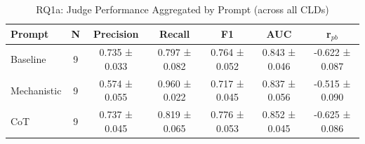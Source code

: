 \begin{table}[htbp]
\centering
\caption{RQ1a: Judge Performance Aggregated by Prompt (across all CLDs)}
\label{tab:rq1a_by_prompt}
\begin{tabular}{lcccccc}
\toprule
\textbf{Prompt} & \textbf{N} & \textbf{Precision} & \textbf{Recall} & \textbf{F1} & \textbf{AUC} & \textbf{r$_{pb}$} \\
\midrule
Baseline & 9 & 0.735 ± 0.033 & 0.797 ± 0.082 & 0.764 ± 0.052 & 0.843 ± 0.046 & -0.622 ± 0.087 \\
Mechanistic & 9 & 0.574 ± 0.055 & 0.960 ± 0.022 & 0.717 ± 0.045 & 0.837 ± 0.056 & -0.515 ± 0.090 \\
CoT & 9 & 0.737 ± 0.045 & 0.819 ± 0.065 & 0.776 ± 0.053 & 0.852 ± 0.045 & -0.625 ± 0.086 \\
\bottomrule
\end{tabular}
\end{table}